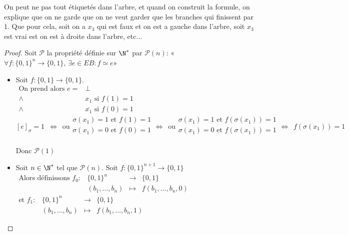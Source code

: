 \begin{com}
	On peut ne pas tout étiquetés dans l'arbre, et quand on construit la formule, on explique que on ne garde que on ne veut garder que les branches qui finissent par $1$. Que pour cela, soit on a $x_3$ qui est faux et on est a gauche dans l'arbre, soit $x_3$ est vrai est on est à droite dans l'arbre, etc...
\end{com}

\begin{proof}
	Soit $\mathcal P$ la propriété définie sur $\N^*$ par $\mathcal P(n)$: «$\forall f:\{0,1\}^n \to \{0,1\}, \, \exists e \in EB : f \simeq e$»
	
	\begin{itemize}[label = $\star$]
		\item Soit $f : \{0,1\} \to \{0,1\}$.\\
		
			$\begin{array}{rl}
				\text{On prend alors } e = & \bot \\
				\wedge & x_1 \text{ si } f(1) = 1 \\
				\wedge & \overline{x_1} \text{ si } f(0) = 1
			\end{array}$ \\
		$[e]_\sigma = 1 \enspace \Leftrightarrow \enspace \text{ou} \begin{array}{c}
			\sigma(x_1) = 1 \text{ et } f(1) = 1\\
			\sigma(x_1) = 0 \text{ et } f(0) = 1\\
		\end{array}  \Leftrightarrow \enspace \text{ou} \begin{array}{c}
			\sigma(x_1) = 1 \text{ et } f(\sigma(x_1)) = 1\\
			\sigma(x_1) = 0 \text{ et } f(\sigma(x_1)) = 1\\
		\end{array}  \Leftrightarrow \enspace f(\sigma(x_1)) = 1  $
		
		Donc $\mathcal P(1)$
		\item Soit $n \in \N^*$ tel que $\mathcal P (n)$. Soit $f : \{0,1\}^{n+1} \to \{0,1\}$\\
		
		$\begin{array}{lrcl}
		\text{Alors définissons } f_0 : & \{0,1\}^n & \to  & \{0,1\} \\
		& (b_1, \dots, b_n) & \mapsto & f(b_1, \dots, b_n, 0)
		\end{array} $$\begin{array}{lrcl}
		\text{et } f_1 : & \{0,1\}^n & \to  & \{0,1\} \\
		& (b_1, \dots, b_n) & \mapsto & f(b_1, \dots, b_n, 1)
		\end{array} $ \\
		

\end{itemize}
\end{proof}
